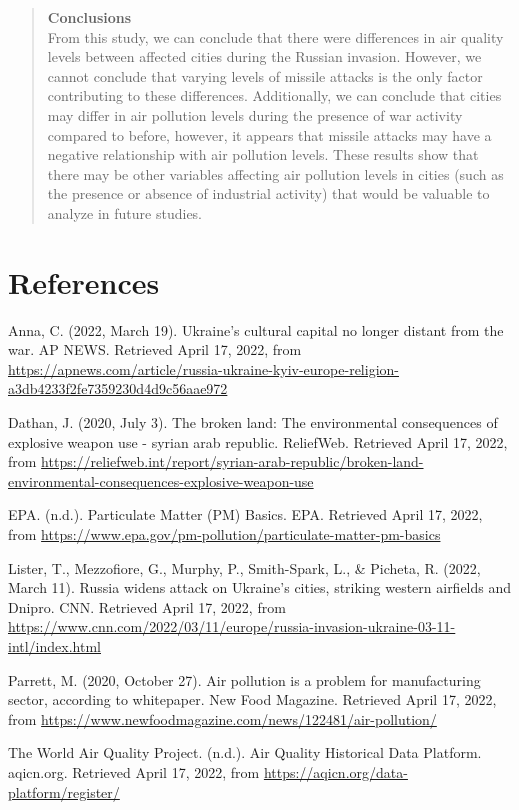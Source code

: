 \documentclass[
  12pt,
]{article}
\begin{document}
\begin{quote}
\textbf{Conclusions}\\
From this study, we can conclude that there were differences in air
quality levels between affected cities during the Russian invasion.
However, we cannot conclude that varying levels of missile attacks is
the only factor contributing to these differences. Additionally, we can
conclude that cities may differ in air pollution levels during the
presence of war activity compared to before, however, it appears that
missile attacks may have a negative relationship with air pollution
levels. These results show that there may be other variables affecting
air pollution levels in cities (such as the presence or absence of
industrial activity) that would be valuable to analyze in future
studies.
\end{quote}

\newpage

\hypertarget{references}{%
\section{References}\label{references}}

Anna, C. (2022, March 19). Ukraine's cultural capital no longer distant
from the war. AP NEWS. Retrieved April 17, 2022, from
\url{https://apnews.com/article/russia-ukraine-kyiv-europe-religion-a3db4233f2fe7359230d4d9c56aae972}

Dathan, J. (2020, July 3). The broken land: The environmental
consequences of explosive weapon use - syrian arab republic. ReliefWeb.
Retrieved April 17, 2022, from
\url{https://reliefweb.int/report/syrian-arab-republic/broken-land-environmental-consequences-explosive-weapon-use}

EPA. (n.d.). Particulate Matter (PM) Basics. EPA. Retrieved April 17,
2022, from
\url{https://www.epa.gov/pm-pollution/particulate-matter-pm-basics}

Lister, T., Mezzofiore, G., Murphy, P., Smith-Spark, L., \& Picheta, R.
(2022, March 11). Russia widens attack on Ukraine's cities, striking
western airfields and Dnipro. CNN. Retrieved April 17, 2022, from
\url{https://www.cnn.com/2022/03/11/europe/russia-invasion-ukraine-03-11-intl/index.html}

Parrett, M. (2020, October 27). Air pollution is a problem for
manufacturing sector, according to whitepaper. New Food Magazine.
Retrieved April 17, 2022, from
\url{https://www.newfoodmagazine.com/news/122481/air-pollution/}

The World Air Quality Project. (n.d.). Air Quality Historical Data
Platform. aqicn.org. Retrieved April 17, 2022, from
\url{https://aqicn.org/data-platform/register/}
\end{document}
